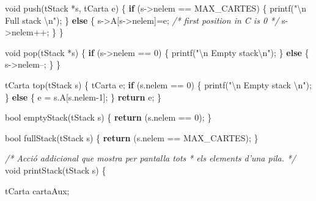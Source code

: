 \documentclass[]{book}
\newenvironment{Shaded}{\begin{snugshade}}{\end{snugshade}}
\newcommand{\DataTypeTok}[1]{\textcolor[rgb]{0.13,0.29,0.53}{#1}}
\newcommand{\DecValTok}[1]{\textcolor[rgb]{0.00,0.00,0.81}{#1}}
\newcommand{\SpecialCharTok}[1]{\textcolor[rgb]{0.00,0.00,0.00}{#1}}
\newcommand{\StringTok}[1]{\textcolor[rgb]{0.31,0.60,0.02}{#1}}
\newcommand{\CommentTok}[1]{\textcolor[rgb]{0.56,0.35,0.01}{\textit{#1}}}
\newcommand{\ControlFlowTok}[1]{\textcolor[rgb]{0.13,0.29,0.53}{\textbf{#1}}}
\newcommand{\NormalTok}[1]{#1}
\begin{document}
\begin{Shaded}
\begin{Highlighting}[]
\DataTypeTok{void}\NormalTok{ push(tStack *s, tCarta e) \{}
    \ControlFlowTok{if}\NormalTok{ (s->nelem == MAX_CARTES) \{}
\NormalTok{        printf(}\StringTok{"}\SpecialCharTok{\textbackslash{}n}\StringTok{ Full stack }\SpecialCharTok{\textbackslash{}n}\StringTok{"}\NormalTok{);}
\NormalTok{    \} }\ControlFlowTok{else}\NormalTok{ \{}
\NormalTok{        s->A[s->nelem]=e; }\CommentTok{/* first position in C is 0 */}
\NormalTok{        s->nelem++;}
\NormalTok{    \}}
\NormalTok{\}}

\DataTypeTok{void}\NormalTok{ pop(tStack *s) \{}
    \ControlFlowTok{if}\NormalTok{ (s->nelem == }\DecValTok{0}\NormalTok{) \{}
\NormalTok{        printf(}\StringTok{"}\SpecialCharTok{\textbackslash{}n}\StringTok{ Empty stack}\SpecialCharTok{\textbackslash{}n}\StringTok{"}\NormalTok{);}
\NormalTok{    \} }\ControlFlowTok{else}\NormalTok{ \{}
\NormalTok{        s->nelem--;}
\NormalTok{    \}}
\NormalTok{\}}

\NormalTok{tCarta top(tStack s) \{}
\NormalTok{    tCarta e;}
    \ControlFlowTok{if}\NormalTok{ (s.nelem == }\DecValTok{0}\NormalTok{) \{}
\NormalTok{        printf(}\StringTok{"}\SpecialCharTok{\textbackslash{}n}\StringTok{ Empty stack }\SpecialCharTok{\textbackslash{}n}\StringTok{"}\NormalTok{);}
\NormalTok{    \} }\ControlFlowTok{else}\NormalTok{ \{}
\NormalTok{        e = s.A[s.nelem-}\DecValTok{1}\NormalTok{];}
\NormalTok{    \}}
    \ControlFlowTok{return}\NormalTok{ e;}
\NormalTok{\}}

\NormalTok{bool emptyStack(tStack s) \{}
    \ControlFlowTok{return}\NormalTok{ (s.nelem == }\DecValTok{0}\NormalTok{);}
\NormalTok{\}}

\NormalTok{bool fullStack(tStack s) \{}
    \ControlFlowTok{return}\NormalTok{ (s.nelem == MAX_CARTES);}
\NormalTok{\}}

\CommentTok{/* Acció addicional que mostra per pantalla tots }
\CommentTok{ * els elements d'una pila. }
\CommentTok{ */}
\DataTypeTok{void}\NormalTok{ printStack(tStack s) \{}
    
\NormalTok{    tCarta cartaAux;}
    

\end{Highlighting}
\end{Shaded}
\end{document}
